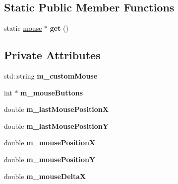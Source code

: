 \subsection*{Static Public Member Functions}
\begin{DoxyCompactItemize}
\item 
\mbox{\label{classflounder_1_1mouse_ac164dd73c45f0babcb67c9e24f50eff2}} 
static \hyperlink{classflounder_1_1mouse}{mouse} $\ast$ {\bfseries get} ()
\end{DoxyCompactItemize}
\subsection*{Private Attributes}
\begin{DoxyCompactItemize}
\item 
\mbox{\label{classflounder_1_1mouse_a89aa0569fc713beaf4bccca9d577a4f1}} 
std\+::string {\bfseries m\+\_\+custom\+Mouse}
\item 
\mbox{\label{classflounder_1_1mouse_aba3da279e30c01441d7fc15232310a5a}} 
int $\ast$ {\bfseries m\+\_\+mouse\+Buttons}
\item 
\mbox{\label{classflounder_1_1mouse_ab2f4c6a045be5a8c7d92c93cf6342c81}} 
double {\bfseries m\+\_\+last\+Mouse\+PositionX}
\item 
\mbox{\label{classflounder_1_1mouse_aac9df3a7e9b1356a965892b72d005dc3}} 
double {\bfseries m\+\_\+last\+Mouse\+PositionY}
\item 
\mbox{\label{classflounder_1_1mouse_ae85e51fcab064d6346f791d389f3a1d2}} 
double {\bfseries m\+\_\+mouse\+PositionX}
\item 
\mbox{\label{classflounder_1_1mouse_a66d2a2b1d99fb4d09b15289b48a54e2d}} 
double {\bfseries m\+\_\+mouse\+PositionY}
\item 
\mbox{\label{classflounder_1_1mouse_affb25c47e2b2e1286c9c8625ec030c2f}} 
double {\bfseries m\+\_\+mouse\+DeltaX}
\item 
\mbox{\label{classflounder_1_1mouse_a835234c63febb18da66ac1333ec8b46a}} 

\end{DoxyCompactItemize}
